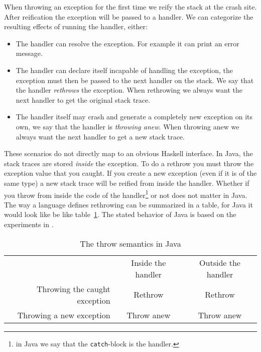 When throwing an exception for the first time we reify the stack
at the crash site. After reification the exception will be passed to a handler.
We can categorize the resulting effects of running the handler, either:

\begin{itemize}
  \item
    The handler can resolve the exception. For example it can print an
    error message.

  \item
    The handler can declare itself incapable of handling the exception,
    the exception must then be passed to the next handler on the stack.
    We say that the handler \emph{rethrows} the exception. When
    rethrowing we always want the next handler to get the original stack
    trace.

  \item
    The handler itself may crash and generate a completely new exception
    on its own, we say that the handler is \emph{throwing anew}. When
    throwing anew we always want the next handler to get a new stack
    trace.

\end{itemize}

These scenarios do not directly map to an obvious Haskell
interface. In Java, the stack traces
are stored \emph{inside} the exception. To do a rethrow you must throw
the exception value that you caught. If you create a new exception (even
if it is of the same type) a new stack trace will be reified from inside
the handler. Whether if you throw from inside the code of the
handler\footnote{in Java we say that the \texttt{catch}-block is the handler.}
or not does not matter in Java. The way a language defines rethrowing can be summarized
in a table, for Java it would look like be like table~\ref{tab:java_throw_semantics}. The
stated behavior of Java is based on the experiments in \cite{github_gist_in_out_java}.

\begin{table}[t]
  \centering
  \begin{tabular}{r|c|c|}
    \multicolumn{1}{r}{}
    &  \multicolumn{1}{c}{Inside the handler}
    & \multicolumn{1}{c}{Outside the handler} \\
    \cline{2-3}
    Throwing the caught exception & Rethrow    & Rethrow \\
    \cline{2-3}
    Throwing a new exception      & Throw anew & Throw anew \\
    \cline{2-3}
  \end{tabular}
  \caption{The throw semantics in Java}
  \label{tab:java_throw_semantics}
\end{table}

